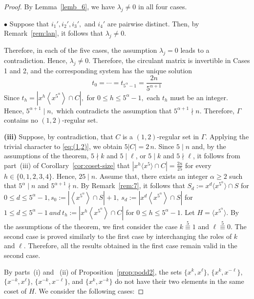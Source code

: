 \documentclass[12pt]{article}
\begin{document}
\begin{proof}
By Lemma~\ref{lemb_6}, we have $\lambda_j \neq 0$ in all four cases.


$\bullet$
Suppose that $i_1', i_2', i_3',$ and $i_4'$ are pairwise distinct. Then, by Remark~\ref{rem:lan}, it follows that $\lambda_j\neq 0$.

\medskip

Therefore, in each of the five cases, the assumption $\lambda_j=0$ leads to a contradiction. Hence, $\lambda_j\neq0$. Therefore, the circulant matrix is invertible in Cases 1 and 2, and the corresponding system has the unique solution
\[
t_0=\cdots=t_{5^\alpha-1}=\frac{2n}{5^{\alpha+1}}
\]
Since
$
t_h=\left|x^h\left\langle x^{5^{\alpha}}\right\rangle\cap C\right|,$ for
$0\le h\le5^{\alpha}-1,
$
each \(t_h\) must be an integer. Hence,
$
5^{\alpha+1}\mid n,
$
which contradicts the assumption that
$
5^{\alpha+1}\nmid n.
$
Therefore, \(\Gamma\) contains no \((1,2)\)-regular set.
 	
\textbf{(iii)}  Suppose, by contradiction, that \(C\) is a \((1,2)\)-regular set in \(\Gamma\). Applying the trivial character to \eqref{eq:(1,2)}, we obtain \(5|C|=2\,n\). Since \(5\mid n\) and, by the assumptions of the theorem, $5\nmid k$ and $5\mid \ell$, or $5\mid k$ and $5\nmid \ell$, it follows from part~(iii) of Corollary~\ref{cor:coset-size} that \(\left|x^{h}\langle x^{5}\rangle\cap C\right|=\frac{2n}{25}\) for every \(h\in\{0,1,2,3,4\}\). Hence, \(25\mid n\). Assume that, there exists an integer \(\alpha\ge 2\) such that
$
5^{\alpha}\mid n$
and
$5^{\alpha+1}\nmid n.$ By Remark~\ref{rem:7}, it follows that $ S_d := x^d \langle x^{5^{\alpha}} \rangle \cap S$ for $0 \le d \le 5^{\alpha}-1, s_0:=\left|\left\langle x^{5^{\alpha}}\right\rangle\cap S\right|+1,\ 	s_d:=\left|x^d\left\langle x^{5^{\alpha}}\right\rangle\cap S\right|$ for $1\le d\le 5^{\alpha}-1\ and\ t_h:=\left|x^h\left\langle x^{5^{\alpha}}\right\rangle\cap C\right|$ for $0\le h\le 5^{\alpha}-1.$ Let
$
H=\langle x^{5^{\alpha}}\rangle.
$ By the assumptions of the theorem, we first consider the case \(k \stackrel{5}{\equiv} 1\) and \(\ell \stackrel{5}{\equiv} 0\). The second case is proved similarly to the first case by interchanging the roles of \(k\) and \(\ell\). Therefore, all the results obtained in the first case remain valid in the second case.

By parts~(i) and ~(ii)  of Proposition~\ref{prop:podd2}, the sets $\{x^k,x^\ell\}$, $\{x^k,x^{-\ell}\}$, $\{x^{-k},x^{\ell}\}$, $\{x^{-k},x^{-\ell}\}$, and $\{x^{k},x^{-k}\}$  do not have their two elements in the same coset of $H$. We consider the following cases:


\end{proof}
\end{document}
